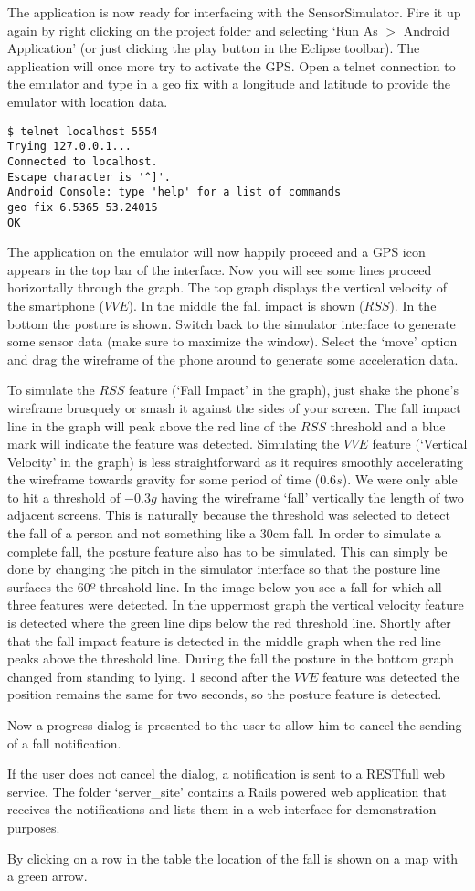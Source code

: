 \documentclass[a4paper, 10pt]{article}
\newcommand{\image}[3][\textwidth]{%
  \begin{figure}[H]%
    \centering%
    \setlength\fboxsep{0pt}\fbox{\texttt{[image: \#2]}}%
    \ifthenelse{\isempty{#3}}%
      {}%
      {\caption{{#3}}}%
    \label{fig:{#2}}%
  \end{figure}
}
\begin{document}
The application is now ready for interfacing with the SensorSimulator. Fire it up again by right clicking on the project folder and selecting `Run As $>$ Android Application' (or just clicking the play button in the Eclipse toolbar). The application will once more try to activate the GPS. Open a telnet connection to the emulator and type in a geo fix with a longitude and latitude to provide the emulator with location data.
\begin{lstlisting}
$ telnet localhost 5554
Trying 127.0.0.1...
Connected to localhost.
Escape character is '^]'.
Android Console: type 'help' for a list of commands
geo fix 6.5365 53.24015
OK
\end{lstlisting}
The application on the emulator will now happily proceed and a GPS icon appears in the top bar of the interface. Now you will see some lines proceed horizontally through the graph. The top graph displays the vertical velocity of the smartphone ($VVE$). In the middle the fall impact is shown ($RSS$). In the bottom the posture is shown. Switch back to the simulator interface to generate some sensor data (make sure to maximize the window). Select the `move' option and drag the wireframe of the phone around to generate some acceleration data.
\image{simulator.png}{}
To simulate the $RSS$ feature (`Fall Impact' in the graph), just shake the phone's wireframe brusquely or smash it against the sides of your screen. The fall impact line in the graph will peak above the red line of the $RSS$ threshold and a blue mark will indicate the feature was detected. Simulating the $VVE$ feature (`Vertical Velocity' in the graph) is less straightforward as it requires smoothly accelerating the wireframe towards gravity for some period of time ($0.6s$). We were only able to hit a threshold of $-0.3g$ having the wireframe `fall' vertically the length of two adjacent screens. This is naturally because the threshold was selected to detect the fall of a person and not something like a 30cm fall. In order to simulate a complete fall, the posture feature also has to be simulated. This can simply be done by changing the pitch in the simulator interface so that the posture line surfaces the 60º threshold line. 
\newpage
In the image below you see a fall for which all three features were detected. In the uppermost graph the vertical velocity feature is detected where the green line dips below the red threshold line. Shortly after that the fall impact feature is detected in the middle graph when the red line peaks above the threshold line. During the fall the posture in the bottom graph changed from standing to lying. 1 second after the $VVE$ feature was detected the position remains the same for two seconds, so the posture feature is detected.
\image{fall_detected.png}{}
Now a progress dialog is presented to the user to allow him to cancel the sending of a fall notification.
\image{sending_notification.png}{}
\newpage
If the user does not cancel the dialog, a notification is sent to a RESTfull web service. The folder `server\_site' contains a Rails powered web application that receives the notifications and lists them in a web interface for demonstration purposes. 
\image{server_site.png}{}
By clicking on a row in the table the location of the fall is shown on a map with a green arrow.
\image{map.png}{}
\end{document}

